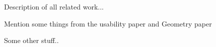 
Description of all related work...

Mention some things from the usability paper\cite{summary:usability} and Geometry paper\cite{1667626}

Some other stuff..
